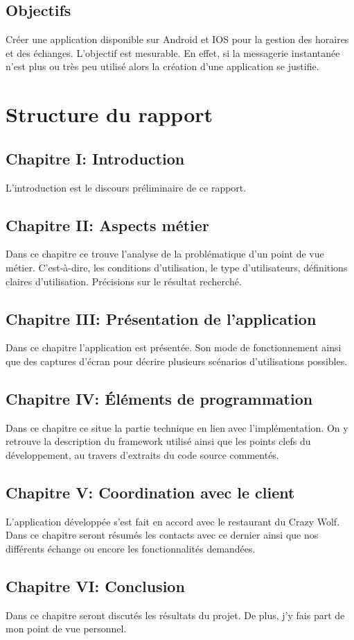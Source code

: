 \subsection*{Objectifs}

Créer une application disponible sur Android et IOS pour la gestion des horaires et des échanges. L'objectif est mesurable. En effet, si la messagerie instantanée n'est plus ou très peu utilisé alors la création d'une application se justifie.


\section[Structure du rapport]{Structure du rapport}

\subsection*{Chapitre I: Introduction}
L'introduction est le discours préliminaire de ce rapport.

\subsection*{Chapitre II: Aspects métier}
Dans ce chapitre ce trouve l'analyse de la problématique d'un point de vue métier. C'est-à-dire, les conditions d'utilisation, le type d'utilisateurs, définitions claires d'utilisation. Précisions sur le résultat recherché.

\subsection*{Chapitre III: Présentation de l'application}
Dans ce chapitre l'application est présentée. Son mode de fonctionnement ainsi que des captures d'écran pour décrire plusieurs scénarios d'utilisations possibles.

\subsection*{Chapitre IV: Éléments de programmation}
Dans ce chapitre ce situe la partie technique en lien avec l'implémentation. On y retrouve la description du framework utilisé ainsi que les points clefs du développement, au travers d'extraits du code source commentés.

\subsection*{Chapitre V: Coordination avec le client}
L'application développée s'est fait en accord avec le restaurant du Crazy Wolf. Dans ce chapitre seront résumés les contacts avec ce dernier ainsi que nos différents échange ou encore les fonctionnalités demandées.

\subsection*{Chapitre VI: Conclusion}
Dans ce chapitre seront discutés les résultats du projet. De plus, j'y fais part de mon point de vue personnel.


